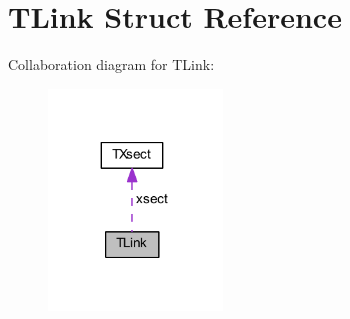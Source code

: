 \hypertarget{struct_t_link}{}\section{T\+Link Struct Reference}
\label{struct_t_link}


Collaboration diagram for T\+Link\+:
\nopagebreak
\begin{figure}[H]
\begin{center}
\leavevmode
\includegraphics[width=131pt]{d6/d33/struct_t_link__coll__graph}
\end{center}
\end{figure}
